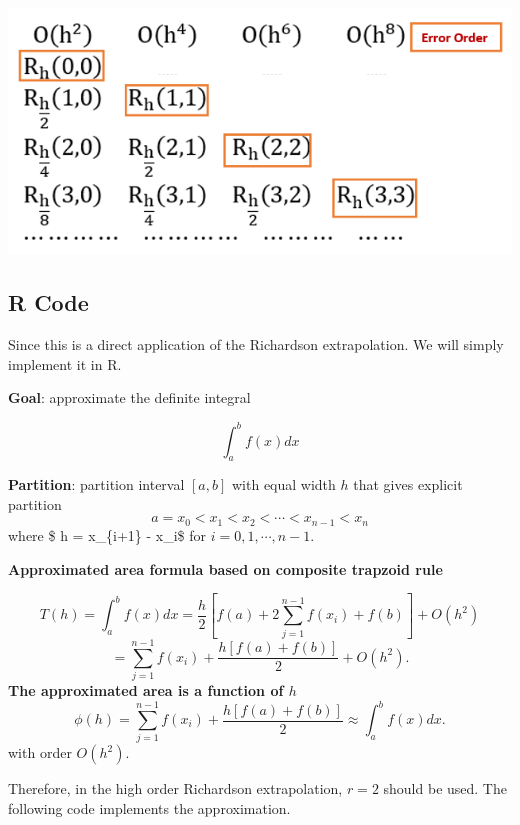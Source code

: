 \documentclass[
]{book}
\begin{document}
\begin{center}\includegraphics[width=0.45\linewidth]{img13/w13-RombergRichardsonTable} \end{center}

\hfill\break

\hypertarget{r-code}{%
\subsection{R Code}\label{r-code}}

Since this is a direct application of the Richardson extrapolation. We will simply implement it in R.

\textbf{Goal}: approximate the definite integral

\[
\int_a^b f(x)dx
\]

\textbf{Partition}: partition interval \([a,b]\) with equal width \(h\) that gives explicit partition
\[
a=x_0 < x_1 < x_2 < \cdots < x_{n-1} < x_n
\]
where \$ h = x\_\{i+1\} - x\_i\$ for \(i = 0, 1, \cdots, n-1\).

\textbf{Approximated area formula based on composite trapzoid rule}

\[
T(h) = \int_a^bf(x)dx = \frac{h}{2}\left[f(a) + 2\sum_{j=1}^{n-1}f(x_i) + f(b) \right] +O(h^2)
\]
\[
= \sum_{j=1}^{n-1}f(x_i) + \frac{h[f(a) + f(b)]}{2} + O(h^2).
\]
\textbf{The approximated area is a function of \(h\)}
\[
\phi(h) =  \sum_{j=1}^{n-1}f(x_i) + \frac{h[f(a) + f(b)]}{2} \approx\int_a^b f(x) dx.
\]
with order \(O(h^2)\).

Therefore, in the high order Richardson extrapolation, \(r = 2\) should be used. The following code implements the approximation.
\end{document}
